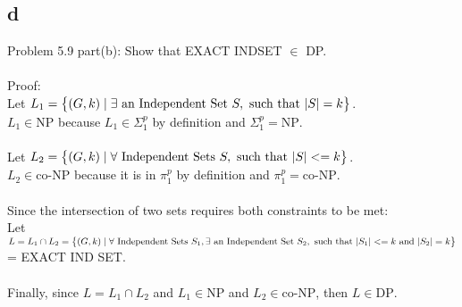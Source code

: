 \documentclass[letterpaper,notitlepage,twoside]{article}
\begin{document}
\subsection*{d}
Problem 5.9 part(b): Show that EXACT INDSET $\in $ DP.
\\\\
Proof:\\
Let $L_1 = \left\{ \left( G, k \right) \mid \exists \text{ an Independent Set } S, \text{ such that } \abs{S} = k \right\}$.\\
$L_1 \in \text{NP}$ because $L_1 \in \Sigma_1^p$ by definition and $\Sigma_1^p = \text{NP}$.
\\\\
Let $L_2 = \left\{ \left( G, k \right) \mid \forall \text{ Independent Sets } S, \text{ such that } \abs{S} <= k \right\}$.\\
$L_2 \in \text{co-NP}$ because it is in $\pi_1^p$ by definition and $\pi_1^p = \text{co-NP}$.
\\\\
Since the intersection of two sets requires both constraints to be met:\\
Let $L = L_1 \cap L_2 = \left\{ \left( G, k \right) \mid \forall \text{ Independent Sets } S_1, \exists \text{ an Independent Set } S_2, \text{ such that } \abs{S_1} <= k \text{ and } \abs{S_2} = k \right\}$ = EXACT IND SET.\\\\
Finally, since $L = L_1 \cap L_2$ and $L_1 \in \text{NP}$ and $L_2 \in \text{co-NP}$, then $L \in \text{DP}$.
\end{document}
